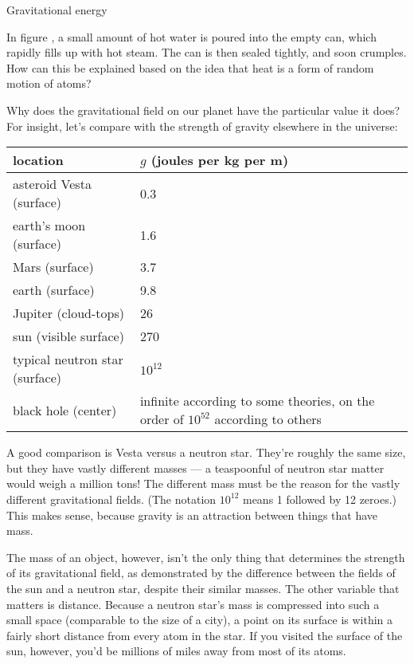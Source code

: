 \begin{envsubsection}{Gravitational energy}
\dqheader
\begin{dq}\label{dq:can}
In figure , a small amount of hot water is poured into the empty can, which
rapidly fills up with hot steam. The can is then sealed tightly, and soon crumples.
How can this be explained based on the idea that heat is a form of random motion of
atoms?

\end{dq}


\vfill

Why does the gravitational field on our planet have the particular value it does? 
For insight, let's compare with the strength of gravity elsewhere in the
universe:

\begin{tabular}{|p{50mm}|p{45mm}|}
\hline
location      & $g$ (joules per kg per m) \\
\hline
asteroid Vesta (surface) & 0.3 \\
earth's moon (surface)   & 1.6 \\
Mars (surface)           & 3.7 \\
earth (surface)          & 9.8 \\
Jupiter (cloud-tops)     & 26 \\
sun (visible surface)    & 270 \\
typical neutron star (surface) & $10^{12}$ \\
black hole (center)      & infinite according to some theories, on the
   order of $10^{52}$ according to others \\
\hline
\end{tabular}

A good comparison is Vesta versus a neutron star. They're roughly the same size, but they have
vastly different masses --- a teaspoonful of neutron star matter would weigh a million tons!
The different mass must be the reason for the vastly different gravitational fields. (The notation
$10^{12}$ means 1 followed by 12 zeroes.)
This makes sense, because gravity is an attraction between things that have mass.

The mass of an object, however, isn't the only thing that determines the strength of its
gravitational field, as demonstrated by the difference between the fields of the
sun and a neutron star, despite their similar masses.  The other variable that matters is
distance. Because a neutron star's mass is compressed into such a small space (comparable
to the size of a city), a point on its surface is within a fairly short distance from every
atom in the star. If you visited the surface of the sun, however, you'd be millions of miles
away from most of its atoms.


\end{envsubsection}
